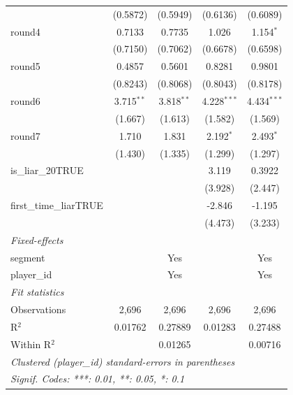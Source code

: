 \begin{tabular}{lcccc}
                             & (0.5872)     & (0.5949)     & (0.6136)      & (0.6089)\\   
   round4                    & 0.7133       & 0.7735       & 1.026         & 1.154$^{*}$\\   
                             & (0.7150)     & (0.7062)     & (0.6678)      & (0.6598)\\   
   round5                    & 0.4857       & 0.5601       & 0.8281        & 0.9801\\   
                             & (0.8243)     & (0.8068)     & (0.8043)      & (0.8178)\\   
   round6                    & 3.715$^{**}$ & 3.818$^{**}$ & 4.228$^{***}$ & 4.434$^{***}$\\   
                             & (1.667)      & (1.613)      & (1.582)       & (1.569)\\   
   round7                    & 1.710        & 1.831        & 2.192$^{*}$   & 2.493$^{*}$\\   
                             & (1.430)      & (1.335)      & (1.299)       & (1.297)\\   
   is\_liar\_20TRUE          &              &              & 3.119         & 0.3922\\   
                             &              &              & (3.928)       & (2.447)\\   
   first\_time\_liarTRUE     &              &              & -2.846        & -1.195\\   
                             &              &              & (4.473)       & (3.233)\\   
   \midrule
   \emph{Fixed-effects}\\
   segment                   &              & Yes          &               & Yes\\  
   player\_id                &              & Yes          &               & Yes\\  
   \midrule
   \emph{Fit statistics}\\
   Observations              & 2,696        & 2,696        & 2,696         & 2,696\\  
   R$^2$                     & 0.01762      & 0.27889      & 0.01283       & 0.27488\\  
   Within R$^2$              &              & 0.01265      &               & 0.00716\\  
   \midrule \midrule
   \multicolumn{5}{l}{\emph{Clustered (player\_id) standard-errors in parentheses}}\\
   \multicolumn{5}{l}{\emph{Signif. Codes: ***: 0.01, **: 0.05, *: 0.1}}\\
\end{tabular}
\par\endgroup


